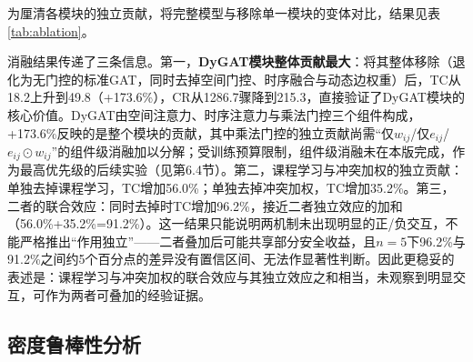 \documentclass[12pt,a4paper,UTF8]{ctexart}
\begin{document}
为厘清各模块的独立贡献，将完整模型与移除单一模块的变体对比，结果见表\ref{tab:ablation}。

\begin{table}[H]
    \centering
    \caption{消融实验（$n=5$）}
    \label{tab:ablation}
\end{table}

消融结果传递了三条信息。第一，\textbf{DyGAT模块整体贡献最大}：将其整体移除（退化为无门控的标准GAT，同时去掉空间门控、时序融合与动态边权重）后，TC从18.2上升到49.8（+173.6\%），CR从1286.7骤降到215.3，直接验证了DyGAT模块的核心价值。DyGAT由空间注意力、时序注意力与乘法门控三个组件构成，+173.6\%反映的是整个模块的贡献，其中乘法门控的独立贡献尚需“仅$w_{ij}$/仅$e_{ij}$/$e_{ij}\odot w_{ij}$”的组件级消融加以分解；受训练预算限制，组件级消融未在本版完成，作为最高优先级的后续实验（见第6.4节）。第二，课程学习与冲突加权的独立贡献：单独去掉课程学习，TC增加56.0\%；单独去掉冲突加权，TC增加35.2\%。第三，二者的联合效应：同时去掉时TC增加96.2\%，接近二者独立效应的加和（56.0\%+35.2\%=91.2\%）。这一结果只能说明两机制未出现明显的正/负交互，不能严格推出“作用独立”——二者叠加后可能共享部分安全收益，且$n=5$下96.2\%与91.2\%之间约5个百分点的差异没有置信区间、无法作显著性判断。因此更稳妥的表述是：课程学习与冲突加权的联合效应与其独立效应之和相当，未观察到明显交互，可作为两者可叠加的经验证据。

\subsection{密度鲁棒性分析}
\end{document}
